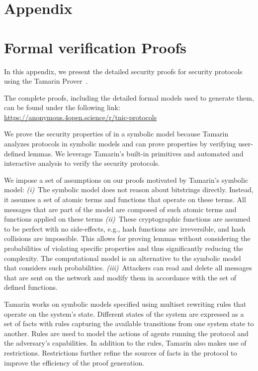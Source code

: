 
\section*{Appendix}
\section{Formal verification Proofs}
\label{sec:formal-verification-details}
In this appendix, we present the detailed security proofs for \projecttitle{} security protocols using
the Tamarin Prover~\cite{tamarin-prover}. 



 The complete proofs, including the detailed formal models used to generate them, can be found under the following link:\\{\color{blue}\url{https://anonymous.4open.science/r/tnic-protocols}}


 We prove the security properties of \projecttitle{}  in a symbolic model because Tamarin analyzes protocols in symbolic models and can prove properties by verifying user-defined lemmas. We leverage Tamarin's built-in primitives and automated and interactive analysis to verify the security protocols.

We impose a set of assumptions on our proofs motivated by Tamarin's symbolic model: \emph{(i)}~The symbolic model does not reason about bitstrings directly. Instead, it assumes a set of atomic terms and functions that operate on these terms. All messages that are part of the model are composed of such atomic terms and functions applied on these terms \emph{(ii)}~These cryptographic functions are assumed to be perfect with no side-effects, e.g., hash functions are irreversible, and hash collisions are impossible. This allows for proving lemmas without considering the probabilities of violating specific properties and thus significantly reducing the complexity. The computational model is an alternative to the symbolic model that considers such probabilities. \emph{(iii)}~Attackers can read and delete all messages that are sent on the network and modify them in accordance with the set of defined functions.

Tamarin works on symbolic models specified using multiset rewriting rules that operate on the system's state. Different states of the system are expressed as a set of facts with rules capturing the available transitions from one system state to another. Rules are used to model the actions of agents running the protocol and the adversary’s capabilities. In addition to the rules, Tamarin also makes use of restrictions. Restrictions further refine the sources of facts in the protocol to improve the efficiency of the proof generation.

